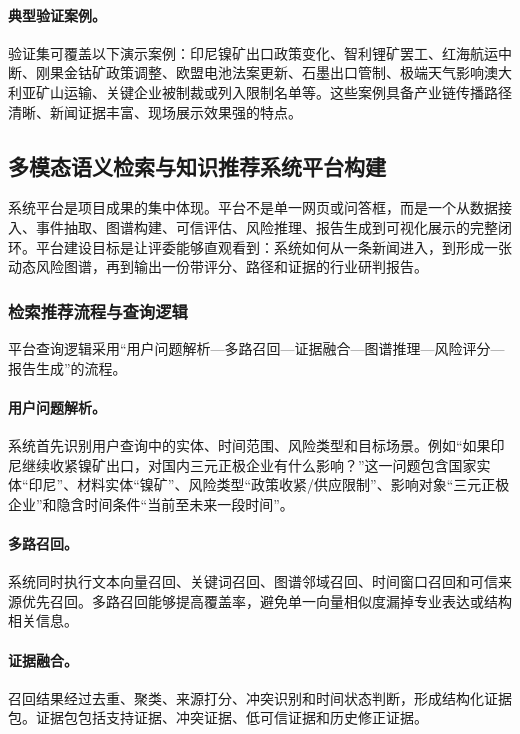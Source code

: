 \documentclass[12pt,a4paper]{article}
\begin{document}
\paragraph{典型验证案例。}验证集可覆盖以下演示案例：印尼镍矿出口政策变化、智利锂矿罢工、红海航运中断、刚果金钴矿政策调整、欧盟电池法案更新、石墨出口管制、极端天气影响澳大利亚矿山运输、关键企业被制裁或列入限制名单等。这些案例具备产业链传播路径清晰、新闻证据丰富、现场展示效果强的特点。

\subsection{多模态语义检索与知识推荐系统平台构建}

系统平台是项目成果的集中体现。平台不是单一网页或问答框，而是一个从数据接入、事件抽取、图谱构建、可信评估、风险推理、报告生成到可视化展示的完整闭环。平台建设目标是让评委能够直观看到：系统如何从一条新闻进入，到形成一张动态风险图谱，再到输出一份带评分、路径和证据的行业研判报告。

\subsubsection{检索推荐流程与查询逻辑}

平台查询逻辑采用“用户问题解析—多路召回—证据融合—图谱推理—风险评分—报告生成”的流程。

\paragraph{用户问题解析。}系统首先识别用户查询中的实体、时间范围、风险类型和目标场景。例如“如果印尼继续收紧镍矿出口，对国内三元正极企业有什么影响？”这一问题包含国家实体“印尼”、材料实体“镍矿”、风险类型“政策收紧/供应限制”、影响对象“三元正极企业”和隐含时间条件“当前至未来一段时间”。

\paragraph{多路召回。}系统同时执行文本向量召回、关键词召回、图谱邻域召回、时间窗口召回和可信来源优先召回。多路召回能够提高覆盖率，避免单一向量相似度漏掉专业表达或结构相关信息。

\paragraph{证据融合。}召回结果经过去重、聚类、来源打分、冲突识别和时间状态判断，形成结构化证据包。证据包包括支持证据、冲突证据、低可信证据和历史修正证据。
\end{document}
